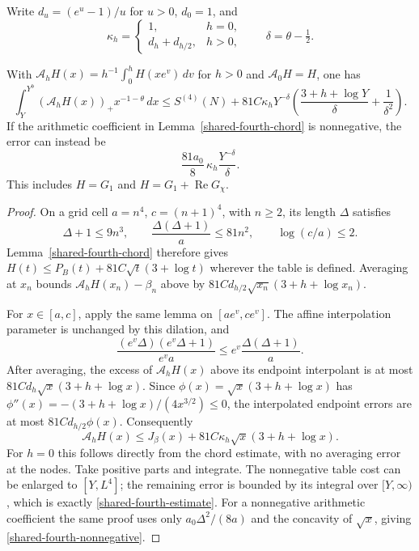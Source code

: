 Write $d_u=(e^u-1)/u$ for $u>0$, $d_0=1$, and
\[
 \kappa_h=\begin{cases}1,&h=0,\\d_h+d_{h/2},&h>0,\end{cases}
 \qquad\delta=\theta-\tfrac12.
\]
\begin{theorem}\label{shared-fourth-theorem}
With $\mathcal A_hH(x)=h^{-1}\int_0^hH(xe^v)\,dv$ for $h>0$
and $\mathcal A_0H=H$, one has
\begin{equation}\label{shared-fourth-estimate}
 \int_Y^{Y^b}(\mathcal A_hH(x))_+x^{-1-\theta}\,dx
 \le S^{(4)}(N)+81C\kappa_hY^{-\delta}
 \left(\frac{3+h+\log Y}{\delta}+\frac1{\delta^2}\right).
\end{equation}
If the arithmetic coefficient in Lemma~\ref{shared-fourth-chord}
is nonnegative, the error can instead be
\begin{equation}\label{shared-fourth-nonnegative}
 \frac{81a_0}{8}\,\kappa_h\frac{Y^{-\delta}}\delta.
\end{equation}
This includes $H=G_1$ and $H=G_1+\operatorname{Re}G_\chi$.
\end{theorem}
\begin{proof}
On a grid cell $a=n^4$, $c=(n+1)^4$, with $n\ge2$, its length
$\Delta$ satisfies
\[
 \Delta+1\le9n^3,\qquad
 \frac{\Delta(\Delta+1)}a\le81n^2,\qquad \log(c/a)\le2.
\]
Lemma~\ref{shared-fourth-chord} therefore gives
$H(t)\le P_B(t)+81C\sqrt t(3+\log t)$ wherever the table is
defined. Averaging at $x_n$ bounds
$\mathcal A_hH(x_n)-\beta_n$ above by
$81Cd_{h/2}\sqrt{x_n}(3+h+\log x_n)$.

For $x\in[a,c]$, apply the same lemma on $[ae^v,ce^v]$.
The affine interpolation parameter is unchanged by this dilation,
and
\[
 \frac{(e^v\Delta)(e^v\Delta+1)}{e^v a}
 \le e^v\frac{\Delta(\Delta+1)}a.
\]
After averaging, the excess of $\mathcal A_hH(x)$ above its
endpoint interpolant is at most
$81Cd_h\sqrt x(3+h+\log x)$. Since
$\phi(x)=\sqrt x(3+h+\log x)$ has
$\phi''(x)=-(3+h+\log x)/(4x^{3/2})\le0$, the interpolated
endpoint errors are at most $81Cd_{h/2}\phi(x)$. Consequently
\[
 \mathcal A_hH(x)\le J_\beta(x)
                 +81C\kappa_h\sqrt x(3+h+\log x).
\]
For $h=0$ this follows directly from the chord estimate, with no
averaging error at the nodes. Take positive parts and integrate.
The nonnegative table cost can be enlarged to $[Y,L^4]$; the
remaining error is bounded by its integral over $[Y,\infty)$,
which is exactly \eqref{shared-fourth-estimate}.
For a nonnegative arithmetic coefficient the same proof uses only
$a_0\Delta^2/(8a)$ and the concavity of $\sqrt x$, giving
\eqref{shared-fourth-nonnegative}.
\end{proof}

